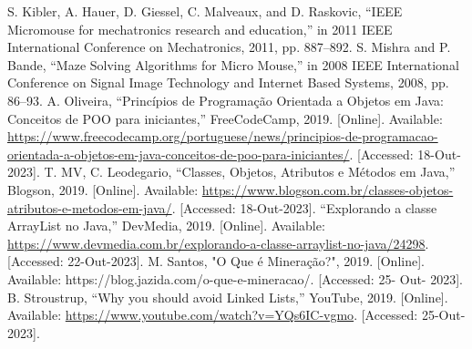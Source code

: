 


% 
% 
 S. Kibler, A. Hauer, D. Giessel, C. Malveaux, and D. Raskovic, ``IEEE Micromouse for mechatronics research and education,'' in 2011 IEEE International Conference on Mechatronics, 2011, pp. 887--892.
 S. Mishra and P. Bande, ``Maze Solving Algorithms for Micro Mouse,'' in 2008 IEEE International Conference on Signal Image Technology and Internet Based Systems, 2008, pp. 86--93.
 A. Oliveira, ``Princípios de Programação Orientada a Objetos em Java: Conceitos de POO para iniciantes,'' FreeCodeCamp, 2019. [Online]. Available: \url{https://www.freecodecamp.org/portuguese/news/principios-de-programacao-orientada-a-objetos-em-java-conceitos-de-poo-para-iniciantes/}. [Accessed: 18-Out-2023].
 T. MV, C. Leodegario, ``Classes, Objetos, Atributos e Métodos em Java,'' Blogson, 2019. [Online]. Available: \url{https://www.blogson.com.br/classes-objetos-atributos-e-metodos-em-java/}. [Accessed: 18-Out-2023].
 ``Explorando a classe ArrayList no Java,'' DevMedia, 2019. [Online]. Available: \url{https://www.devmedia.com.br/explorando-a-classe-arraylist-no-java/24298}. [Accessed: 22-Out-2023].
 M. Santos, "O Que é Mineração?", 2019. [Online]. Available: https://blog.jazida.com/o-que-e-mineracao/. [Accessed: 25- Out- 2023].
 B. Stroustrup, ``Why you should avoid Linked Lists,'' YouTube, 2019. [Online]. Available: \url{https://www.youtube.com/watch?v=YQs6IC-vgmo}. [Accessed: 25-Out-2023].



